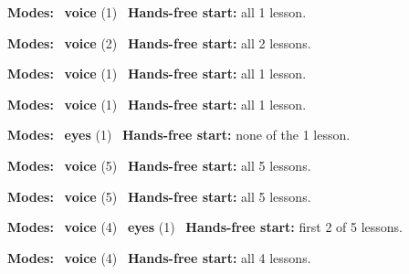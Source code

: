 \expandafter\def\csname hlchaptermodality42\endcsname{%
  {\small\noindent
    \textbf{Modes:} \hlvoicesign{}~\textbf{voice} (1)\quad
    \hlvoicesign{}~\textbf{Hands-free start:} all 1 lesson.%
    \par}\medskip
}

\expandafter\def\csname hlchaptermodality43\endcsname{%
  {\small\noindent
    \textbf{Modes:} \hlvoicesign{}~\textbf{voice} (2)\quad
    \hlvoicesign{}~\textbf{Hands-free start:} all 2 lessons.%
    \par}\medskip
}

\expandafter\def\csname hlchaptermodality44\endcsname{%
  {\small\noindent
    \textbf{Modes:} \hlvoicesign{}~\textbf{voice} (1)\quad
    \hlvoicesign{}~\textbf{Hands-free start:} all 1 lesson.%
    \par}\medskip
}

\expandafter\def\csname hlchaptermodality45\endcsname{%
  {\small\noindent
    \textbf{Modes:} \hlvoicesign{}~\textbf{voice} (1)\quad
    \hlvoicesign{}~\textbf{Hands-free start:} all 1 lesson.%
    \par}\medskip
}

\expandafter\def\csname hlchaptermodality46\endcsname{%
  {\small\noindent
    \textbf{Modes:} \hlsightsign{}~\textbf{eyes} (1)\quad
    \hlvoicesign{}~\textbf{Hands-free start:} none of the 1 lesson.%
    \par}\medskip
}

\expandafter\def\csname hlchaptermodality47\endcsname{%
  {\small\noindent
    \textbf{Modes:} \hlvoicesign{}~\textbf{voice} (5)\quad
    \hlvoicesign{}~\textbf{Hands-free start:} all 5 lessons.%
    \par}\medskip
}

\expandafter\def\csname hlchaptermodality48\endcsname{%
  {\small\noindent
    \textbf{Modes:} \hlvoicesign{}~\textbf{voice} (5)\quad
    \hlvoicesign{}~\textbf{Hands-free start:} all 5 lessons.%
    \par}\medskip
}

\expandafter\def\csname hlchaptermodality49\endcsname{%
  {\small\noindent
    \textbf{Modes:} \hlvoicesign{}~\textbf{voice} (4) \quad \hlsightsign{}~\textbf{eyes} (1)\quad
    \hlvoicesign{}~\textbf{Hands-free start:} first 2 of 5 lessons.%
    \par}\medskip
}

\expandafter\def\csname hlchaptermodality50\endcsname{%
  {\small\noindent
    \textbf{Modes:} \hlvoicesign{}~\textbf{voice} (4)\quad
    \hlvoicesign{}~\textbf{Hands-free start:} all 4 lessons.%
    \par}\medskip
}


